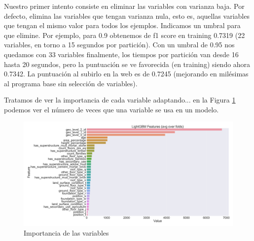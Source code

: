 \documentclass[a4paper, 20pt]{article}
\begin{document}
Nuestro primer intento consiste en eliminar las variables con varianza baja. Por defecto, elimina las variables que tengan varianza nula, esto es, aquellas variables que tengan el mismo valor para todos los ejemplos. Indicamos un umbral para que elimine. Por ejemplo, para 0.9 obtenemos de f1 score en training 0.7319 (22 variables, en torno a 15 segundos por partición). Con un umbral de 0.95 nos quedamos con 33 variables finalmente, los tiempos por partición van desde 16 hasta 20 segundos, pero la puntuación se ve favorecida (en training) siendo ahora 0.7342. La puntuación al subirlo en la web es de 0.7245 (mejorando en milésimas al programa base sin selección de variables).

Tratamos de ver la importancia de cada variable adaptando...%
en la Figura \ref{fig:lgbm_imp_04} podemos ver el número de veces que una variable se usa en un modelo.
\begin{figure}[H]
    \centering
    \includegraphics[height=0.9\textwidth, width=1.0\textwidth]{lgbm_importances04}
    \caption{Importancia de las variables}
    \label{fig:lgbm_imp_04}
\end{figure}
\end{document}
